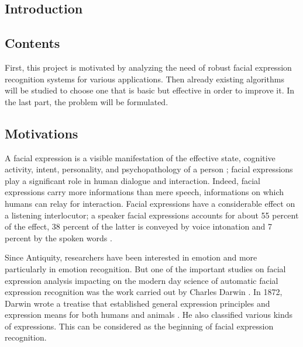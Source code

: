   \begin{titlepage}
    \vspace*{\fill}
      \part{Introduction}
    \vspace*{\fill}
  \end{titlepage}

\chapter*{Contents}

First, this project is motivated by analyzing the need of robust facial expression recognition systems for various applications. Then already existing algorithms will be studied to choose one that is basic but effective in order to improve it. In the last part, the problem will be formulated.
\pagebreak

\chapter{Motivations}

A facial expression is a visible manifestation of the effective state, cognitive activity, intent, personality, and psychopathology of a person \cite{DON99}; facial expressions play a significant role in human dialogue and interaction. Indeed, facial expressions carry more informations than mere speech, informations on which humans can relay for interaction. Facial expressions have a considerable effect on a listening interlocutor; a speaker facial expressions accounts for about 55 percent of the effect, 38 percent of the latter is conveyed by voice intonation and 7 percent by the spoken words \cite{PAN00}.
\newline

\noindent Since Antiquity, researchers have been interested in emotion and more particularly in emotion recognition. But one of the important studies on facial expression analysis impacting on the modern day science of automatic facial expression recognition was the work carried out by Charles Darwin \cite{BET12}. In 1872, Darwin wrote a treatise that established general expression principles and expression means for both humans and animals \cite{DAR04}. He also classified various kinds of expressions. This can be considered as the beginning of facial expression recognition.
\newline

